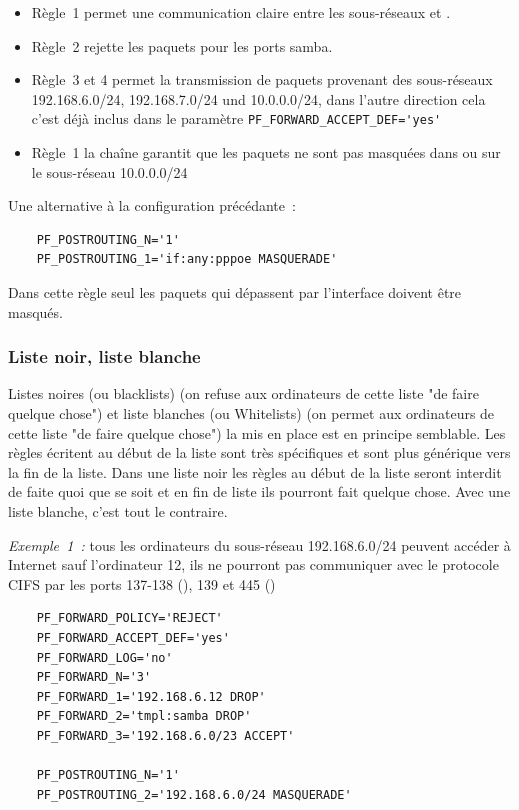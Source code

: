 \begin{itemize}
\item Règle~1 permet une communication claire entre les sous-réseaux
   et .
\item Règle~2 rejette les paquets pour les ports samba.
\item Règle~3 et 4 permet la transmission de paquets provenant des sous-réseaux
  192.168.6.0/24, 192.168.7.0/24 und 10.0.0.0/24, dans l'autre direction cela
  c'est déjà inclus dans le paramètre \verb+PF_FORWARD_ACCEPT_DEF='yes'+
\item Règle~1 la chaîne  garantit que les paquets ne sont
pas masquées dans ou sur le sous-réseau 10.0.0.0/24
\end{itemize}

Une alternative à la configuration précédante~:

\begin{example}
\begin{verbatim}
    PF_POSTROUTING_N='1'
    PF_POSTROUTING_1='if:any:pppoe MASQUERADE'
\end{verbatim}
\end{example}

Dans cette règle seul les paquets qui dépassent par l'interface 
doivent être masqués.

\subsubsection{Liste noir, liste blanche}

Listes noires (ou blacklists) (on refuse aux ordinateurs de cette liste
"de faire quelque chose") et liste blanches (ou Whitelists) (on permet aux
ordinateurs de cette liste "de faire quelque chose") la mis en place est en
principe semblable. Les règles écritent au début de la liste sont très
spécifiques et sont plus générique vers la fin de la liste. Dans une liste noir
les règles au début de la liste seront interdit de faite quoi que se soit et
en fin de liste ils pourront fait quelque chose. Avec une liste blanche, c'est
tout le contraire.

\emph{Exemple~1~:} tous les ordinateurs du sous-réseau 192.168.6.0/24 peuvent
accéder à Internet sauf l'ordinateur 12, ils ne pourront pas communiquer
avec le protocole CIFS par les ports 137-138 (), 139 et 445
()

\begin{example}
\begin{verbatim}
    PF_FORWARD_POLICY='REJECT'
    PF_FORWARD_ACCEPT_DEF='yes'
    PF_FORWARD_LOG='no'
    PF_FORWARD_N='3'
    PF_FORWARD_1='192.168.6.12 DROP'
    PF_FORWARD_2='tmpl:samba DROP'
    PF_FORWARD_3='192.168.6.0/23 ACCEPT'

    PF_POSTROUTING_N='1'
    PF_POSTROUTING_2='192.168.6.0/24 MASQUERADE'
\end{verbatim}
\end{example}

